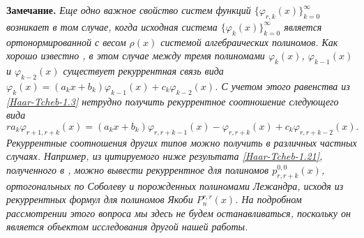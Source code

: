 \textbf{Замечание.} \textit{
Еще одно важное свойство систем функций  $\{\varphi_{r,k}(x)\}_{k=0}^\infty$ возникает в том случае, когда исходная система $\{\varphi_{k}(x)\}_{k=0}^\infty$  является ортонормированной с весом $\rho(x)$ системой алгебраических полиномов. Как хорошо известно \cite{Haar-Tcheb-Sege}, в этом случае между тремя полиномами $\varphi_{k}(x)$, $\varphi_{k-1}(x)$ и $\varphi_{k-2}(x)$ существует рекуррентная связь вида $\varphi_{k}(x)=(a_kx+b_k)\varphi_{k-1}(x)+c_k\varphi_{k-2}(x)$. С учетом этого равенства из \eqref{Haar-Tcheb-1.3} нетрудно получить рекуррентное соотношение следующего вида
 $$ra_k\varphi_{r+1,r+k}(x)=(a_kx+b_k)\varphi_{r,r+k-1}(x)-\varphi_{r,r+k}(x)
 +c_k\varphi_{r,r+k-2}(x).$$
 Рекуррентные соотношения других типов можно получить в различных частных случаях. Например, из  цитируемого ниже результата \eqref{Haar-Tcheb-1.21}, полученного в \cite{Haar-Tcheb-Shar11},  можно вывести рекуррентное для полиномов $p_{r,r+k}^{0,0}(x)$, ортогональных по Соболеву и порожденных полиномами Лежандра, исходя из рекуррентных формул для полиномов Якоби $P_n^{r,r}(x)$.
На подробном рассмотрении этого вопроса мы здесь не будем останавливаться, поскольку он является объектом исследования другой нашей работы.}

